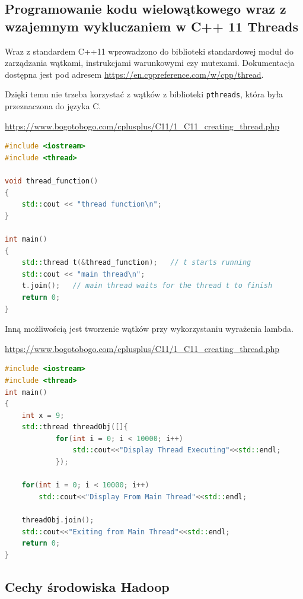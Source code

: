 \documentclass[wi]{zut}
\begin{document}
\subsection{Programowanie kodu wielowątkowego wraz z wzajemnym wykluczaniem w C++ 11 Threads}

Wraz z standardem C++11 wprowadzono do biblioteki standardowej moduł do zarządzania wątkami, instrukcjami warunkowymi czy mutexami. Dokumentacja dostępna jest pod adresem \url{https://en.cppreference.com/w/cpp/thread}.

Dzięki temu nie trzeba korzystać z wątków z biblioteki \lstinline{pthreads}, która była przeznaczona do języka C.

{\url{https://www.bogotobogo.com/cplusplus/C11/1_C11_creating_thread.php}}{\label{kod:przyklad}}
\begin{lstlisting}[language=C++]
#include <iostream>
#include <thread>

void thread_function()
{
    std::cout << "thread function\n";
}

int main()
{
    std::thread t(&thread_function);   // t starts running
    std::cout << "main thread\n";
    t.join();   // main thread waits for the thread t to finish
    return 0;
}
\end{lstlisting}

Inną możliwością jest tworzenie wątków przy wykorzystaniu wyrażenia lambda.

{\url{https://www.bogotobogo.com/cplusplus/C11/1_C11_creating_thread.php}}{\label{kod:przyklad}}
\begin{lstlisting}[language=C++]
#include <iostream>
#include <thread>
int main()  
{
    int x = 9;
    std::thread threadObj([]{
            for(int i = 0; i < 10000; i++)
                std::cout<<"Display Thread Executing"<<std::endl;
            });
            
    for(int i = 0; i < 10000; i++)
        std::cout<<"Display From Main Thread"<<std::endl;
        
    threadObj.join();
    std::cout<<"Exiting from Main Thread"<<std::endl;
    return 0;
}
\end{lstlisting}

\subsection{Cechy środowiska Hadoop}
\end{document}
